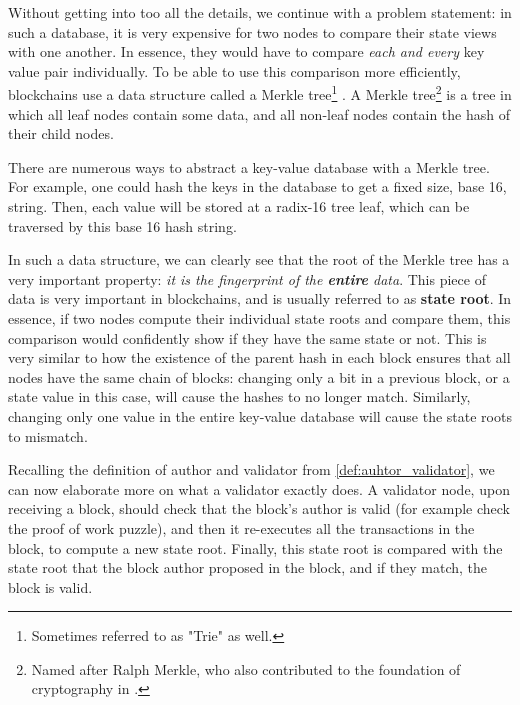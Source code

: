 Without getting into too all the details, we continue with a problem statement: in such a database,
it is very expensive for two nodes to compare their state views with one another. In essence, they
would have to compare \textit{each and every} key value pair individually. To be able to use this
comparison more efficiently, blockchains use a data structure called a Merkle
tree\footnote{Sometimes referred to as "Trie" as well.} \cite{merkleDigitalSignatureBased1988}. A
Merkle tree\footnote{Named after Ralph Merkle, who also contributed to the foundation of
cryptography in \cite{merkleSecureCommunicationsInsecure1978}.} is a tree in which all leaf nodes
contain some data, and all non-leaf nodes contain the hash of their child nodes.

There are numerous ways to abstract a key-value database with a Merkle tree. For example, one could
hash the keys in the database to get a fixed size, base 16, string. Then, each value will be stored
at a radix-16 tree leaf, which can be traversed by this base 16 hash string.


In such a data structure, we can clearly see that the root of the Merkle tree has a very important
property: \textit{it is the fingerprint of the \textbf{entire} data}. This piece of data is very
important in blockchains, and is usually referred to as \textbf{state root}. In essence, if two nodes
compute their individual state roots and compare them, this comparison would confidently show if
they have the same state or not. This is very similar to how the existence of the parent hash in each
block ensures that all nodes have the same chain of blocks: changing only a bit in a previous
block, or a state value in this case, will cause the hashes to no longer match. Similarly, changing
only one value in the entire key-value database will cause the state roots to mismatch.

Recalling the definition of author and validator from \ref{def:auhtor_validator}, we can now
elaborate more on what a validator exactly does. A validator node, upon receiving a block, should
check that the block's author is valid (for example check the proof of work puzzle), and then it
re-executes all the transactions in the block, to compute a new state root. Finally, this state
root is compared with the state root that the block author proposed in the block, and if they match,
the block is valid.

